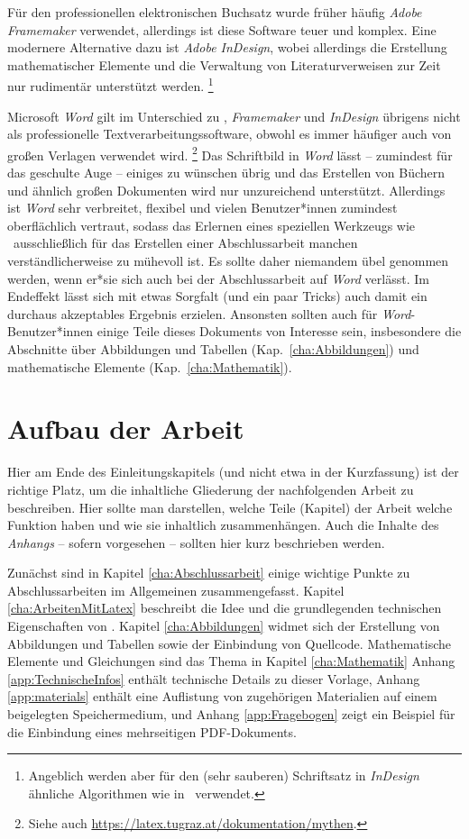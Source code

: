 Für den professionellen elektronischen Buchsatz wurde früher
häufig \emph{Adobe Framemaker} verwendet, allerdings ist diese
Software teuer und komplex. Eine modernere Alternative dazu ist
\emph{Adobe InDesign}, wobei allerdings die Erstellung
mathematischer Elemente und die Verwaltung von Literaturverweisen
zur Zeit nur rudimentär unterstützt werden.%
\footnote{Angeblich werden aber für den (sehr sauberen) Schriftsatz 
in \emph{InDesign} ähnliche Algorithmen wie in \latex\ verwendet.}

Microsoft \emph{Word} gilt im Unterschied zu \latex, 
\emph{Framemaker} und \emph{InDesign} übrigens nicht als professionelle
Textverarbeitungssoftware, obwohl es immer häufiger auch von
großen Verlagen verwendet wird.%
\footnote{Siehe auch \url{https://latex.tugraz.at/dokumentation/mythen}.}
Das Schriftbild in \emph{Word}
lässt -- zumindest für das geschulte Auge -- einiges zu wünschen
übrig und das Erstellen von Büchern und ähnlich großen Dokumenten
wird nur unzureichend unterstützt. Allerdings ist \emph{Word} sehr
verbreitet, flexibel und vielen Benutzer*innen zumindest oberflächlich
vertraut, sodass das Erlernen eines speziellen Werkzeugs wie
\latex\ ausschließlich für das Erstellen einer Abschlussarbeit
manchen verständlicherweise zu mühevoll ist. Es sollte daher
niemandem übel genommen werden, wenn er*sie sich auch bei der Abschlussarbeit
auf \emph{Word} verlässt. Im Endeffekt lässt sich mit etwas
Sorgfalt (und ein paar Tricks) auch damit ein durchaus akzeptables
Ergebnis erzielen. 
Ansonsten sollten auch für \emph{Word}-Benutzer*innen 
einige Teile dieses Dokuments von Interesse sein, insbesondere die
Abschnitte über Abbildungen und Tabellen
(Kap.~\ref{cha:Abbildungen}) und mathematische Elemente
(Kap.~\ref{cha:Mathematik}).


\section{Aufbau der Arbeit}

Hier am Ende des Einleitungskapitels (und nicht
etwa in der Kurzfassung) ist der richtige Platz, um die
inhaltliche Gliederung der nachfolgenden Arbeit zu beschreiben.
Hier sollte man darstellen, welche Teile (Kapitel) der Arbeit
welche Funktion haben und wie sie inhaltlich zusammenhängen. Auch
die Inhalte des \emph{Anhangs} -- sofern vorgesehen -- sollten hier
kurz beschrieben werden.

Zunächst sind in Kapitel \ref{cha:Abschlussarbeit} einige wichtige
Punkte zu Abschlussarbeiten im Allgemeinen zusammengefasst.
Kapitel \ref{cha:ArbeitenMitLatex} beschreibt die Idee und die
grundlegenden technischen Eigenschaften von \latex.
Kapitel \ref{cha:Abbildungen} widmet sich der Erstellung von Abbildungen
und Tabellen sowie der Einbindung von Quellcode.
Mathematische Elemente und Gleichungen sind das Thema in Kapitel \ref{cha:Mathematik} 
\usw
Anhang \ref{app:TechnischeInfos} enthält technische Details zu
dieser Vorlage, 
Anhang \ref{app:materials} enthält eine Auflistung von zugehörigen Materialien
auf einem beigelegten Speichermedium, und 
Anhang \ref{app:Fragebogen} zeigt ein Beispiel für die
Einbindung eines mehrseitigen PDF-Dokuments.

